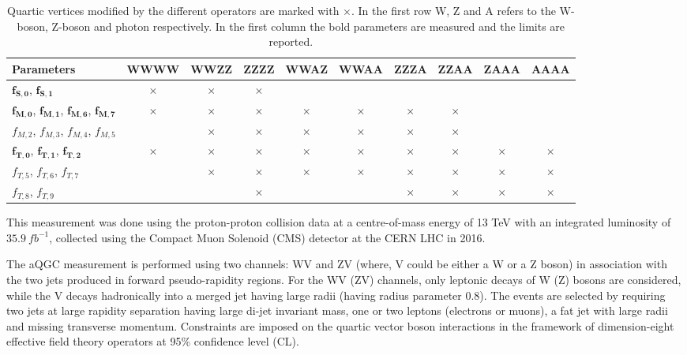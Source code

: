 \begin{table}
\centering
{\scriptsize
\begin{tabular}[!htbp]{|l | c  |c  |c  |c  |c  |c  |c | c  |c |}
\hline
 Parameters   & WWWW & WWZZ & ZZZZ & WWAZ & WWAA & ZZZA & ZZAA & ZAAA & AAAA \\
\hline
$\bm{f_{S,0}}$, $\bm{f_{S,1}}$ &$\bm{\times}$ & $\bm{\times}$&$\bm{\times}$ & & & & & & \\
\hline
$\bm{f_{M,0}}$, $\bm{f_{M,1}}$, $\bm{f_{M,6}}$, $\bm{f_{M,7}}$  &$\bm{\times}$ &$\bm{\times}$ &$\bm{\times}$ &$\bm{\times}$ &$\bm{\times}$ &$\bm{\times}$ &$\bm{\times}$ & & \\
\hline
$f_{M,2}$, $f_{M,3}$, $f_{M,4}$, $f_{M,5}$  & &$\times$ &$\times$ &$\times$ &$\times$ &$\times$ &$\times$ & & \\
\hline
$\bm{f_{T,0}}$, $\bm{f_{T,1}}$, $\bm{f_{T,2}}$ &$\bm{\times}$ &$\bm{\times}$ &$\bm{\times}$ &$\bm{\times}$ &$\bm{\times}$ &$\bm{\times}$ &$\bm{\times}$ &$\bm{\times}$ &$\bm{\times}$ \\
\hline
$f_{T,5}$, $f_{T,6}$, $f_{T,7}$ & &$\times$ &$\times$ &$\times$ &$\times$ &$\times$ &$\times$ &$\times$ &$\times$ \\
\hline
$f_{T,8}$, $f_{T,9}$  & & &$\times$ & & &$\times$ &$\times$ &$\times$ &$\times$ \\
\hline
\end{tabular}
\caption{Quartic vertices modified by the different operators are marked with $\times$. In the first row W, Z and A refers to the W-boson, Z-boson and photon respectively. In the first column the bold parameters are measured and the limits are reported.}
\label{table:aQGC_alloperator}}
\end{table}
%
This measurement was done using the proton-proton collision data at a centre-of-mass energy of 13 TeV with an integrated luminosity of $35.9~fb^{-1}$, collected using the Compact Muon Solenoid (CMS) detector at the CERN LHC in 2016.

The aQGC measurement is performed using two channels: WV and ZV (where, V could be either a W or a Z boson) in association with the two jets produced in forward pseudo-rapidity regions. For the WV (ZV) channels, only leptonic decays of W (Z) bosons are considered, while the V decays hadronically into a merged jet having large radii (having radius parameter 0.8). The events are selected by requiring two jets at large rapidity separation having large di-jet invariant mass, one or two leptons (electrons or muons), a fat jet with large radii and missing transverse momentum. Constraints are imposed on the quartic vector boson interactions in the framework of dimension-eight effective field theory operators at 95\% confidence level (CL).

